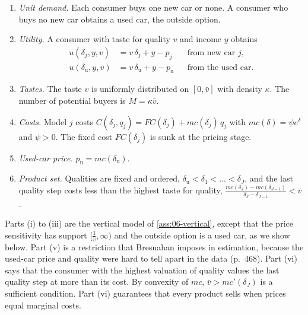 \begin{assumption}\label{ass:06-bres}
\leavevmode
\begin{enumerate}[label=(\roman*)]
\item \emph{Unit demand.} Each consumer buys one new car or none. A consumer who buys no new car obtains a used car,
the outside option.
\item \emph{Utility.} A consumer with taste for quality $v$ and income $y$ obtains
\begin{equation}\label{eq:06-bres-utility}
\begin{aligned}
  u(\delta_j, y, v) &= v\,\delta_j + y - p_j &&\text{from new car } j,\\
  u(\delta_{\mathrm u}, y, v) &= v\,\delta_{\mathrm u} + y - p_{\mathrm u} &&\text{from the used car.}
\end{aligned}
\end{equation}
\item \emph{Tastes.} The taste $v$ is uniformly distributed on $[0,\bar v]$ with density $\kappa$. The number of
potential buyers is $M = \kappa\bar v$.
\item \emph{Costs.} Model $j$ costs $C(\delta_j, q_j) = FC(\delta_j) + mc(\delta_j)\,q_j$ with
$mc(\delta) = \psi e^{\delta}$ and $\psi > 0$. The fixed cost $FC(\delta_j)$ is sunk at the pricing stage.
\item \emph{Used-car price.} $p_{\mathrm u} = mc(\delta_{\mathrm u})$.
\item \emph{Product set.} Qualities are fixed and ordered, $\delta_{\mathrm u} < \delta_1 < \dots < \delta_J$, and the
last quality step costs less than the highest taste for quality,
$\frac{mc(\delta_J) - mc(\delta_{J-1})}{\delta_J - \delta_{J-1}} < \bar v$.
\end{enumerate}
\end{assumption}

Parts (i) to (iii) are the vertical model of \cref{ass:06-vertical}, except that the price sensitivity has support
$[\frac{1}{\bar v}, \infty)$ and the outside option is a used car, as we show below. Part (v) is a restriction that
Bresnahan imposes in estimation, because the used-car price and quality were hard to tell apart in the data
(p.~468). Part (vi) says that the consumer with the highest valuation of quality values the last quality step at
more than its cost. By convexity of $mc$, $\bar v > mc'(\delta_J)$ is a sufficient condition. Part (vi) guarantees
that every product sells when prices equal marginal costs.

